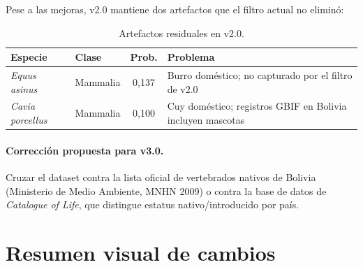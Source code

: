 \documentclass[12pt,a4paper]{article}
\begin{document}
Pese a las mejoras, v2.0 mantiene dos artefactos que el filtro actual no eliminó:

\begin{table}[H]
  \centering
  \caption{Artefactos residuales en v2.0.}
  \label{tab:artefactos}
  \begin{tabular}{p{4cm}lcp{5cm}}
    \toprule
    \textbf{Especie} & \textbf{Clase} & \textbf{Prob.} & \textbf{Problema} \\
    \midrule
    \rowcolor{rojoClaro}\textit{Equus asinus} & Mammalia & 0,137 & Burro doméstico; no capturado por el filtro de v2.0 \\
    \rowcolor{rojoClaro}\textit{Cavia porcellus} & Mammalia & 0,100 & Cuy doméstico; registros GBIF en Bolivia incluyen mascotas \\
    \bottomrule
  \end{tabular}
\end{table}

\paragraph{Corrección propuesta para v3.0.}
Cruzar el dataset contra la lista oficial de vertebrados nativos de Bolivia
(Ministerio de Medio Ambiente, MNHN 2009) o contra la base de datos de
\textit{Catalogue of Life}, que distingue estatus nativo/introducido por país.

\section{Resumen visual de cambios}
\end{document}
